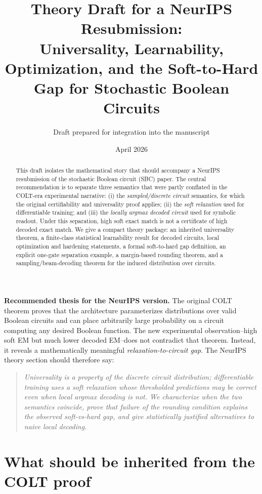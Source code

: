 \documentclass[11pt]{article}
\title{Theory Draft for a NeurIPS Resubmission:\\
Universality, Learnability, Optimization, and the Soft-to-Hard Gap for Stochastic Boolean Circuits}
\author{Draft prepared for integration into the \SBC{} manuscript}
\date{April 2026}
\theoremstyle{definition}
\theoremstyle{remark}
\newcommand{\SBC}{\textnormal{\textsc{SBC}}}
\begin{document}
\maketitle

\begin{abstract}
This draft isolates the mathematical story that should accompany a NeurIPS resubmission of the stochastic Boolean circuit (\SBC{}) paper.  The central recommendation is to separate three semantics that were partly conflated in the COLT-era experimental narrative: (i) the \emph{sampled/discrete circuit} semantics, for which the original certifiability and universality proof applies; (ii) the \emph{soft relaxation} used for differentiable training; and (iii) the \emph{locally argmax decoded circuit} used for symbolic readout.  Under this separation, high soft exact match is not a certificate of high decoded exact match.  We give a compact theory package: an inherited universality theorem, a finite-class statistical learnability result for decoded circuits, local optimization and hardening statements, a formal soft-to-hard gap definition, an explicit one-gate separation example, a margin-based rounding theorem, and a sampling/beam-decoding theorem for the induced distribution over circuits.
\end{abstract}

\vspace{0.5em}
\noindent\textbf{Recommended thesis for the NeurIPS version.}
The original COLT theorem proves that the architecture parameterizes distributions over valid Boolean circuits and can place arbitrarily large probability on a circuit computing any desired Boolean function.  The new experimental observation--high soft EM but much lower decoded EM--does not contradict that theorem.  Instead, it reveals a mathematically meaningful \emph{relaxation-to-circuit gap}.  The NeurIPS theory section should therefore say:
\begin{quote}
\emph{Universality is a property of the discrete circuit distribution; differentiable training uses a soft relaxation whose thresholded predictions may be correct even when local argmax decoding is not.  We characterize when the two semantics coincide, prove that failure of the rounding condition explains the observed soft-vs-hard gap, and give statistically justified alternatives to naive local decoding.}
\end{quote}

\tableofcontents

\section{What should be inherited from the COLT proof}
\end{document}
